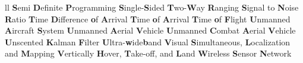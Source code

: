 \documentclass[
	12pt, %
	english, %
	onehalfspacing, %
	liststotoc, %
	toctotoc, %
	parskip, %
	headsepline, %
]{MastersDoctoralThesis} %
\begin{document}
\begin{abbreviations}{ll}
			{\textbf{S}emi \textbf{D}efinite \textbf{P}rogramming}
			{\textbf{S}ingle-\textbf{S}ided \textbf{T}wo-\textbf{W}ay \textbf{R}anging}
			{\textbf{S}ignal to \textbf{N}oise \textbf{R}atio}
			{\textbf{T}ime \textbf{D}ifference \textbf{o}f \textbf{A}rrival}
			{\textbf{T}ime \textbf{o}f \textbf{A}rrival}
			{\textbf{T}ime \textbf{o}f \textbf{F}light}
			{\textbf{U}nmanned \textbf{A}ircraft \textbf{S}ystem}
			{\textbf{U}nmanned \textbf{A}erial \textbf{V}ehicle}
			{\textbf{U}nmanned \textbf{C}ombat \textbf{A}erial \textbf{V}ehicle}
			{\textbf{U}nscented \textbf{K}alman \textbf{F}ilter}
			{\textbf{U}ltra-\textbf{w}ide\textbf{b}and}
			{\textbf{V}isual \textbf{S}imultaneous, \textbf{L}ocalization and \textbf{M}apping}
			{\textbf{V}ertically \textbf{H}over, \textbf{T}ake-off, and \textbf{L}and}
			{\textbf{W}ireless \textbf{S}ensor \textbf{N}etwork}
\end{abbreviations}




\pagestyle{thesis} %
\mainmatter %

\end{document}
